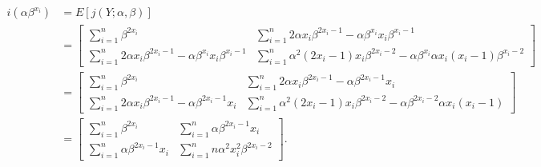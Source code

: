 \begin{align*}
    i\left(\alpha \beta^{x_i} \right) &= E\left[j(Y;\alpha ,\beta)\right]\\
    &= \begin{bmatrix} 
    \sum_{i = 1}^n \beta^{2x_i} 
    &
    \sum_{i = 1}^n 2\alpha x_i \beta^{2x_i - 1} - \alpha\beta^{x_i}x_i\beta^{x_i - 1}
    \\
    \sum_{i = 1}^n 2\alpha x_i \beta^{2x_i - 1} - \alpha\beta^{x_i}x_i\beta^{x_i - 1}
    &
    \sum_{i = 1}^n \alpha^2(2x_i - 1)x_i\beta^{2x_i - 2} - \alpha \beta^{x_i} \alpha x_i(x_i - 1) \beta^{x_i - 2}
    \end{bmatrix} \\
    &= \begin{bmatrix} 
    \sum_{i = 1}^n \beta^{2x_i}  
    &
     \sum_{i = 1}^n 2\alpha x_i \beta^{2x_i - 1} - \alpha\beta^{2x_i-1}x_i
    \\
    \sum_{i = 1}^n 2\alpha x_i \beta^{2x_i - 1} - \alpha\beta^{2x_i-1}x_i
    &
    \sum_{i = 1}^n \alpha^2(2x_i - 1)x_i\beta^{2x_i - 2} - \alpha \beta^{2x_i - 2} \alpha x_i(x_i - 1)
    \end{bmatrix}\\
    &= \begin{bmatrix} 
    \sum_{i = 1}^n \beta^{2x_i}  
    &
     \sum_{i = 1}^n  \alpha\beta^{2x_i-1}x_i
    \\
    \sum_{i = 1}^n  \alpha\beta^{2x_i-1}x_i
    &
    \sum_{i = 1}^n n\alpha^2 x_i^2 \beta^{2x_i - 2}
    \end{bmatrix}.  
\end{align*}

